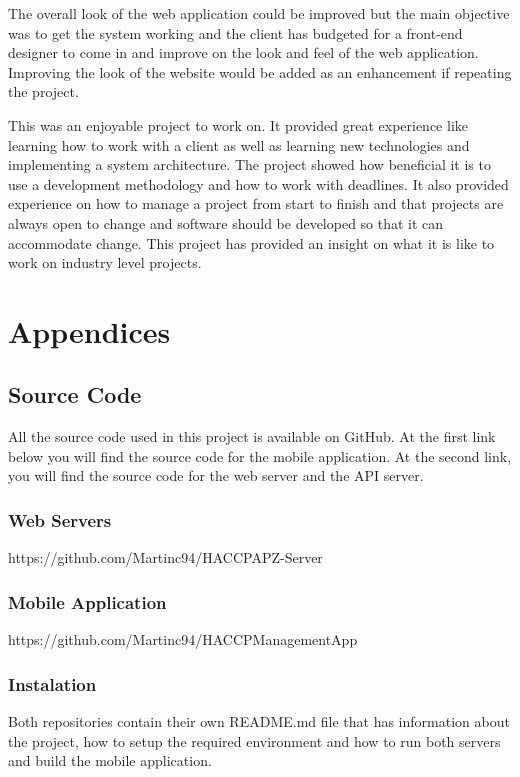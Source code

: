 The overall look of the web application could be improved but the main objective was to get the system working and the client has budgeted for a front-end designer to come in and improve on the look and feel of the web application. Improving the look of the website would be added as an enhancement if repeating the project. 

This was an enjoyable project to work on. It provided great experience like learning how to work with a client as well as learning new technologies and implementing a system architecture. The project showed how beneficial it is to use a development methodology and how to work with deadlines. It also provided experience on how to manage a project from start to finish and that projects are always open to change and software should be developed so that it can accommodate change. This project has provided an insight on what it is like to work on industry level projects.


\chapter{Appendices}

\section{Source Code}
All the source code used in this project is available on GitHub. At the first link below you will find the source code for the mobile application. At the second link, you will find the source code for the web server and the API server.

\subsection{Web Servers}
https://github.com/Martinc94/HACCPAPZ-Server
\subsection{Mobile Application}
https://github.com/Martinc94/HACCPManagementApp

\subsection{Instalation}
Both repositories contain their own README.md file that has information about the project, how to setup the required environment and how to run both servers and build the mobile application.\\
